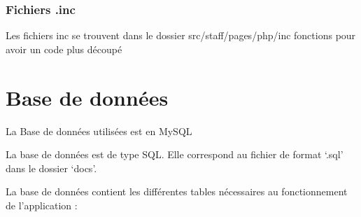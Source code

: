 \documentclass{article}
\begin{document}
\subsubsection{Fichiers .inc}
Les fichiers inc se trouvent dans le dossier src/staff/pages/php/inc
fonctions pour avoir un code plus découpé


\section{Base de données}
La Base de données utilisées est en MySQL

La  base  de  données  est  de  type SQL. Elle  correspond  au  fichier  de  format  ‘.sql’  dans  le dossier ‘docs’.

La  base  de  données  contient  les  différentes  tables  nécessaires  au  fonctionnement  de l’application :
\end{document}
